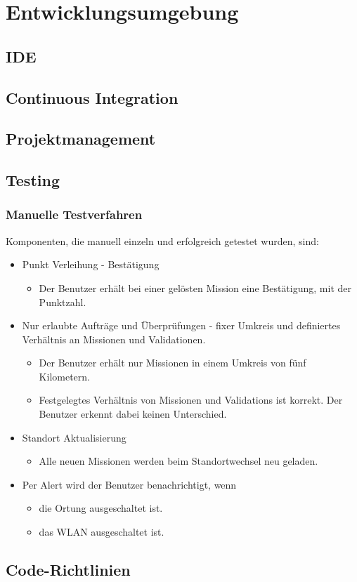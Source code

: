 \chapter{Entwicklungsumgebung}
\label{pd-entwicklungsumgebung}


\section{IDE}


\section{Continuous Integration}


\section{Projektmanagement}


\section{Testing}


\subsection{Manuelle Testverfahren}
Komponenten, die manuell einzeln und erfolgreich getestet wurden, sind:

\begin{itemize}
	\item Punkt Verleihung - Bestätigung
	\begin{itemize}
		\item Der Benutzer erhält bei einer gelösten Mission eine Bestätigung, mit der Punktzahl.
	\end{itemize}
	\item Nur erlaubte Aufträge und Überprüfungen - fixer Umkreis und definiertes Verhältnis an Missionen und Validationen.
	\begin{itemize}
		\item Der Benutzer erhält nur Missionen in einem Umkreis von fünf Kilometern.
		\item Festgelegtes Verhältnis von Missionen und Validations ist korrekt. 
		Der Benutzer erkennt dabei keinen Unterschied.
	\end{itemize}
	\item Standort Aktualisierung
	\begin{itemize}
		\item Alle neuen Missionen werden beim Standortwechsel neu geladen.
	\end{itemize}
	\item Per Alert wird der Benutzer benachrichtigt, wenn
	\begin{itemize}
		\item die Ortung ausgeschaltet ist.
		\item das WLAN ausgeschaltet ist.
	\end{itemize}
\end{itemize}


\section{Code-Richtlinien}